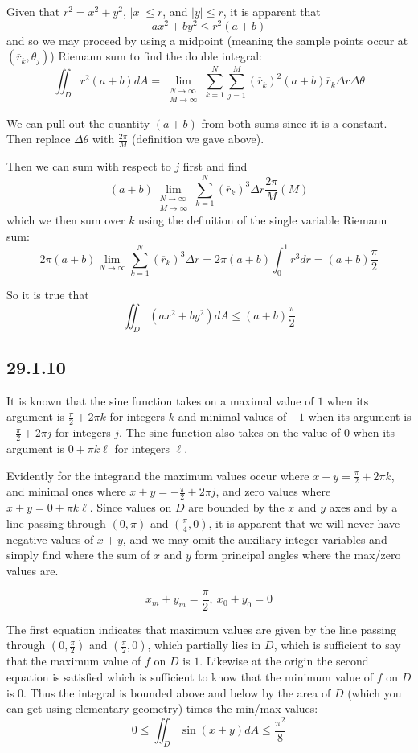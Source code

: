 \documentclass{article}
\begin{document}
Given that $r^2 = x^2 + y^2$, $|x|\leq r$, and $|y|\leq r$, it is apparent that $$ax^2 + by^2\leq r^2(a+b)$$ and so we may proceed by using a midpoint (meaning the sample points occur at $(\overline{r}_k,\theta_j)$) Riemann sum to find the double integral:
$$\iint_D r^2(a+b)dA = \lim_{\substack{N\to \infty \\M\to \infty }} \sum_{k=1}^{N}\sum_{j=1}^{M} (\overline{r}_k)^2(a+b)\overline{r}_k\Delta r \Delta \theta$$

We can pull out the quantity $(a+b)$ from both sums since it is a constant. Then replace $\Delta \theta$ with $\frac{2\pi}{M}$ (definition we gave above). 

Then we can sum with respect to $j$ first and find $$(a+b)\lim_{\substack{N\to \infty \\M\to \infty }} \sum_{k=1}^{N}(\overline{r}_k)^3\Delta r\frac{2\pi}{M}(M)$$ which we then sum over $k$ using the definition of the single variable Riemann sum:
$$2\pi (a+b)\lim_{N\to \infty} \sum_{k=1}^{N}(\overline{r}_k)^3\Delta r = 2\pi (a+b)\int_0^1r^3dr = (a+b)\frac{\pi}{2}$$

So it is true that $$\iint_D (ax^2+by^2)dA \leq (a+b)\frac{\pi}{2}$$

\subsection{29.1.10}

It is known that the sine function takes on a maximal value of $1$ when its argument is $\frac{\pi}{2}+2\pi k$ for integers $k$ and minimal values of $-1$ when its argument is $-\frac{\pi}{2}+2\pi j$ for integers $j$. The sine function also takes on the value of $0$ when its argument is $0+\pi k\ell$ for integers $\ell$.

Evidently for the integrand the maximum values occur where $x+y = \frac{\pi}{2}+2\pi k$, and minimal ones where $x+y = -\frac{\pi}{2}+2\pi j$, and zero values where $x+y = 0+\pi k\ell$. Since values on $D$ are bounded by the $x$ and $y$ axes and by a line passing through $(0,\pi)$ and $(\frac{\pi}{4},0)$, it is apparent that we will never have negative values of $x+y$, and we may omit the auxiliary integer variables and simply find where the sum of $x$ and $y$ form principal angles where the max/zero values are.

$$x_m+y_m = \frac{\pi}{2}, ~x_0+y_0 = 0$$

The first equation indicates that maximum values are given by the line passing through $(0,\frac{\pi}{2})$ and $(\frac{\pi}{2},0)$, which partially lies in $D$, which is sufficient to say that the maximum value of $f$ on $D$ is $1$. Likewise at the origin the second equation is satisfied which is sufficient to know that the minimum value of $f$ on $D$ is $0$. Thus the integral is bounded above and below by the area of $D$ (which you can get using elementary geometry) times the min/max values:
$$0 \leq \iint_D \sin(x+y)dA \leq \frac{\pi^2}{8}$$
\end{document}
